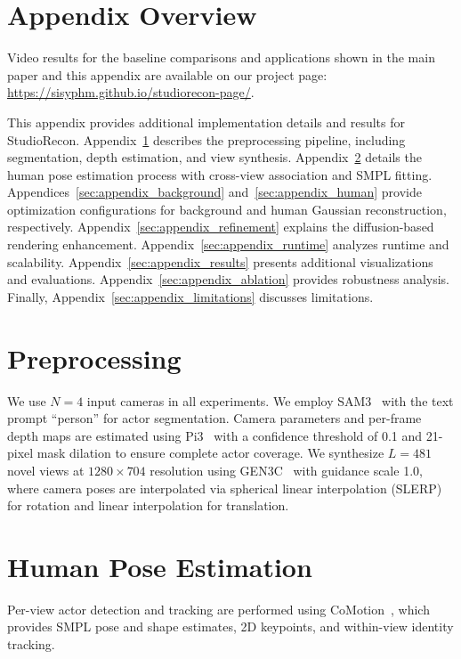 \documentclass[acmtog]{acmart}
\newcommand{\ours}{StudioRecon}
\begin{document}
\section*{Appendix Overview}

Video results for the baseline comparisons and applications shown in the main paper and this appendix are available on our project page: \url{https://sisyphm.github.io/studiorecon-page/}.

This appendix provides additional implementation details and results for \ours{}. Appendix~\ref{sec:appendix_preprocessing} describes the preprocessing pipeline, including segmentation, depth estimation, and view synthesis. Appendix~\ref{sec:appendix_pose} details the human pose estimation process with cross-view association and SMPL fitting. Appendices~\ref{sec:appendix_background} and~\ref{sec:appendix_human} provide optimization configurations for background and human Gaussian reconstruction, respectively. Appendix~\ref{sec:appendix_refinement} explains the diffusion-based rendering enhancement. Appendix~\ref{sec:appendix_runtime} analyzes runtime and scalability. Appendix~\ref{sec:appendix_results} presents additional visualizations and evaluations. Appendix~\ref{sec:appendix_ablation} provides robustness analysis. Finally, Appendix~\ref{sec:appendix_limitations} discusses limitations.

\section{Preprocessing}
\label{sec:appendix_preprocessing}

We use $N=4$ input cameras in all experiments.
We employ SAM3~\cite{carion2025sam} with the text prompt ``person'' for actor segmentation.
Camera parameters and per-frame depth maps are estimated using Pi3~\cite{wang2025pi} with a confidence threshold of 0.1 and 21-pixel mask dilation to ensure complete actor coverage.
We synthesize $L=481$ novel views at $1280 \times 704$ resolution using GEN3C~\cite{ren2025gen3c} with guidance scale 1.0, where camera poses are interpolated via spherical linear interpolation (SLERP) for rotation and linear interpolation for translation.

\section{Human Pose Estimation}
\label{sec:appendix_pose}

Per-view actor detection and tracking are performed using CoMotion~\cite{newell2025comotion}, which provides SMPL pose and shape estimates, 2D keypoints, and within-view identity tracking.
\end{document}
